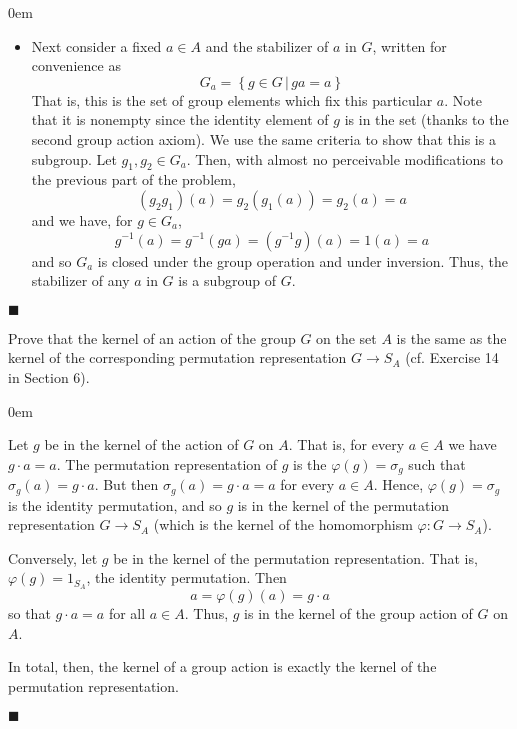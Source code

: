 \documentclass[12pt]{article}
\renewcommand{\qed}{\hfill$\blacksquare$}
\renewenvironment{proof}{\begin{addmargin}[1em]{0em}\begin{newproof}}{\end{newproof}\end{addmargin}\qed}
\newenvironment{problem}[2][Exercise]{\begin{trivlist}
\item[\hskip \labelsep {\bfseries #1}\hskip \labelsep {\bfseries #2.}]}{\end{trivlist}}
\begin{document}
\begin{proof}
\begin{itemize}
    \item Next consider a fixed $a\in A$ and the stabilizer of $a$ in $G$, written for convenience as
    $$ G_a = \left\{ g\in G \, | \, ga=a \right\} $$ That is, this is the set of group elements which fix this particular $a$. Note that it is nonempty since the identity element of $g$ is in the set (thanks to the second group action axiom). We use the same criteria to show that this is a subgroup. Let $g_1,g_2\in G_a$. Then, with almost no perceivable  modifications to the previous part of the problem,
    $$ \left(g_2g_1\right)\left(a\right) = g_2\left(g_1\left(a\right)\right) = g_2\left(a\right) = a $$
    and we have, for $g\in G_a$,
    $$ g^{-1}\left(a\right) = g^{-1}\left(ga\right) = \left(g^{-1}g\right)\left(a\right)=1\left(a\right)= a $$ and so $G_a$ is closed under the group operation and under inversion. Thus, the stabilizer of any $a$ in $G$ is a subgroup of $G$.
\end{itemize}
\end{proof}





\begin{problem}{1.7.5}
Prove that the kernel of an action of the group $G$ on the set $A$ is the same as the kernel of the corresponding permutation representation $G\rightarrow S_A$ (cf. Exercise 14 in Section 6).
\end{problem}
\begin{proof}
Let $g$ be in the kernel of the action of $G$ on $A$. That is, for every $a\in A$ we have $g\cdot a = a$. The permutation representation of $g$ is the $\varphi \left(g\right) = \sigma_g$ such that $\sigma_g \left(a\right) = g\cdot a$. But then $\sigma_g \left(a\right) = g\cdot a = a$ for every $a \in A$. Hence, $\varphi\left(g\right)=\sigma_g$ is the identity permutation, and so $g$ is in the kernel of the permutation representation $G\rightarrow S_A$ (which is the kernel of the homomorphism $\varphi:G\rightarrow S_A$).

Conversely, let $g$ be in the kernel of the permutation representation. That is, $\varphi\left(g\right)=1_{S_A}$, the identity permutation. Then \[ a = \varphi\left(g\right)\left(a\right) = g\cdot a \] so that $g\cdot a = a$ for all $a\in A$. Thus, $g$ is in the kernel of the group action of $G$ on $A$.

In total, then, the kernel of a group action is exactly the kernel of the permutation representation.
\end{proof}
\end{document}
